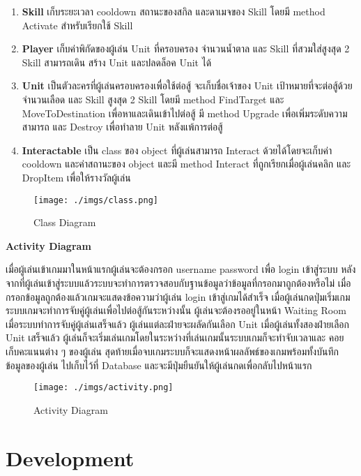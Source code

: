 \documentclass[12pt,oneside,openright,a4paper]{cpe-thai-project}
\begin{document}
\begin{enumerate}
  \item \textbf{Skill} เก็บระยะเวลา cooldown สถานะของสกิล และดาเมจของ Skill 
  โดยมี method Activate สำหรับเรียกใช้ Skill
  \item \textbf{Player} เก็บค่าพิกัดของผู้เล่น Unit ที่ครอบครอง จำนวนน้ำตาล และ Skill 
  ที่สวมใส่สูงสุด 2 Skill สามารถเดิน สร้าง Unit และปลดล็อค Unit ได้
  \item \textbf{Unit} เป็นตัวละครที่ผู้เล่นครอบครองเพื่อใช้ต่อสู้ จะเก็บชื่อเจ้าของ Unit 
  เป้าหมายที่จะต่อสู้ด้วย จำนวนเลือด และ Skill สูงสุด 2 Skill โดยมี method FindTarget และ MoveToDestination เพื่อหาและเดินเข้าไปต่อสู้ มี method Upgrade เพื่อเพิ่มระดับความสามารถ และ Destroy เพื่อทำลาย Unit หลังแพ้การต่อสู้
  \item \textbf{Interactable} เป็น class ของ object ที่ผู้เล่นสามารถ Interact 
  ด้วยได้โดยจะเก็บค่า cooldown และค่าสถานะของ object และมี method Interact ที่ถูกเรียกเมื่อผู้เล่นคลิก และ DropItem เพื่อให้รางวัลผู้เล่น
\end{enumerate}

\begin{figure}[H]\centering
  \texttt{[image: ./imgs/class.png]}
  \caption{Class Diagram}\label{fig:class}
\end{figure}

\pagebreak
\textbf{Activity Diagram}

เมื่อผู้เล่นเข้าเกมมาในหน้าแรกผู้เล่นจะต้องกรอก username password เพื่อ login 
เข้าสู่ระบบ หลังจากที่ผู้เล่นเข้าสู่ระบบแล้วระบบจะทำการตรวจสอบกับฐานข้อมูลว่าข้อมูลที่กรอกมาถูกต้องหรือไม่ 
เมื่อกรอกข้อมูลถูกต้องแล้วเกมจะแสดงข้อความว่าผู้เล่น login เข้าสู่เกมได้สำเร็จ เมื่อผู้เล่นกดปุ่มเริ่มเกม 
ระบบเกมจะทำการจับคู่ผู้เล่นเพื่อไปต่อสู้กันระหว่างนั้น ผู้เล่นจะต้องรออยู่ในหน้า Waiting Room 
เมื่อระบบทำการจับคู่ผู้เล่นเสร็จแล้ว ผู้เล่นแต่ละฝ่ายจะผลัดกันเลือก Unit เมื่อผู้เล่นทั้งสองฝ่ายเลือก 
Unit เสร็จแล้ว ผู้เล่นก็จะเริ่มเล่นเกมโดยในระหว่างที่เล่นเกมนั้นระบบเกมก็จะทำจับเวลาและ
คอยเก็บคะแนนต่าง ๆ ของผู้เล่น สุดท้ายเมื่อจบเกมระบบก็จะแสดงหน้าผลลัพธ์ของเกมพร้อมทั้งบันทึกข้อมูลของผู้เล่น
ไปเก็บไว้ที่ Database และจะมีปุ่มยืนยันให้ผู้เล่นกดเพื่อกลับไปหน้าแรก

\begin{figure}[H]\centering
  \texttt{[image: ./imgs/activity.png]}
  \caption{Activity Diagram}\label{fig:activity}
\end{figure}

\section{Development}
\end{document}

